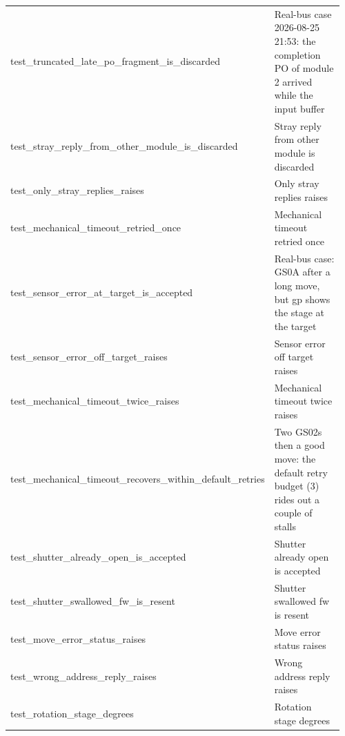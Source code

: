 \begin{longtable}{@{}>{\ttfamily\scriptsize\raggedright\arraybackslash}p{0.40\linewidth} >{\footnotesize\raggedright\arraybackslash}p{0.555\linewidth}@{}}
test\_\allowbreak{}truncated\_\allowbreak{}late\_\allowbreak{}po\_\allowbreak{}fragment\_\allowbreak{}is\_\allowbreak{}discarded & Real-bus case 2026-08-25 21:53: the completion PO of module 2 arrived while the input buffer \\
test\_\allowbreak{}stray\_\allowbreak{}reply\_\allowbreak{}from\_\allowbreak{}other\_\allowbreak{}module\_\allowbreak{}is\_\allowbreak{}discarded & Stray reply from other module is discarded \\
test\_\allowbreak{}only\_\allowbreak{}stray\_\allowbreak{}replies\_\allowbreak{}raises & Only stray replies raises \\
test\_\allowbreak{}mechanical\_\allowbreak{}timeout\_\allowbreak{}retried\_\allowbreak{}once & Mechanical timeout retried once \\
test\_\allowbreak{}sensor\_\allowbreak{}error\_\allowbreak{}at\_\allowbreak{}target\_\allowbreak{}is\_\allowbreak{}accepted & Real-bus case: GS0A after a long move, but gp shows the stage at the target \\
test\_\allowbreak{}sensor\_\allowbreak{}error\_\allowbreak{}off\_\allowbreak{}target\_\allowbreak{}raises & Sensor error off target raises \\
test\_\allowbreak{}mechanical\_\allowbreak{}timeout\_\allowbreak{}twice\_\allowbreak{}raises & Mechanical timeout twice raises \\
test\_\allowbreak{}mechanical\_\allowbreak{}timeout\_\allowbreak{}recovers\_\allowbreak{}within\_\allowbreak{}default\_\allowbreak{}retries & Two GS02s then a good move: the default retry budget (3) rides out a couple of stalls \\
test\_\allowbreak{}shutter\_\allowbreak{}already\_\allowbreak{}open\_\allowbreak{}is\_\allowbreak{}accepted & Shutter already open is accepted \\
test\_\allowbreak{}shutter\_\allowbreak{}swallowed\_\allowbreak{}fw\_\allowbreak{}is\_\allowbreak{}resent & Shutter swallowed fw is resent \\
test\_\allowbreak{}move\_\allowbreak{}error\_\allowbreak{}status\_\allowbreak{}raises & Move error status raises \\
test\_\allowbreak{}wrong\_\allowbreak{}address\_\allowbreak{}reply\_\allowbreak{}raises & Wrong address reply raises \\
test\_\allowbreak{}rotation\_\allowbreak{}stage\_\allowbreak{}degrees & Rotation stage degrees \\
\end{longtable}
